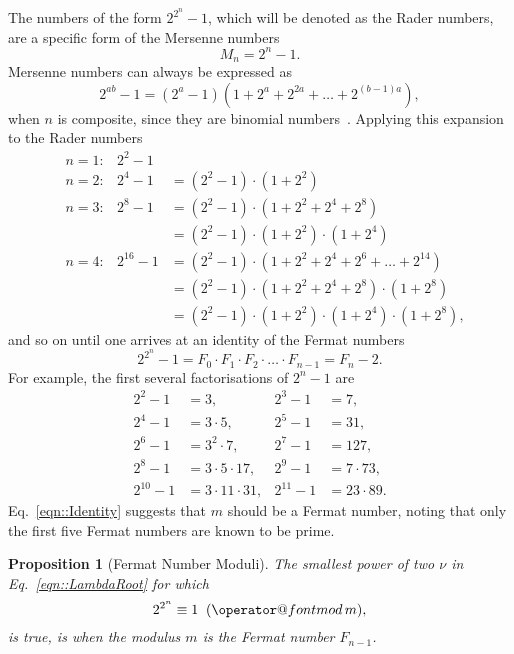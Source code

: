\documentclass[twocolumn]{IEEEtran}
\makeatletter
\def\imod#1{\allowbreak\mkern10mu({\operator@font mod}\,#1)}
\newtheorem{theorem}{Proposition}
\newcommand{\modulusSymbol}{m}
\newcommand{\eqnTag}{Eq.}
\makeatother
\begin{document}
The numbers of the form $2^{2^n} - 1$, which will be denoted as the Rader numbers, are a specific form of the Mersenne numbers
\begin{equation}
 M_n = 2^{n} - 1.
\end{equation}
Mersenne numbers can always be expressed as
\begin{equation}\label{eqn::Binomial}
2^{ab} - 1 = \left(2^{a} - 1\right)\left(1 + 2^a + 2^{2a} + \ldots + 2^{(b-1)a}\right),
\end{equation}
when $n$ is composite, since they are binomial numbers~\citep[pg. 42]{Schumer2004}. Applying this expansion to the Rader numbers 
\begin{align*}
&n = 1:  & 2^2-1 \\
&n = 2:  & 2^4-1 &= (2^2-1)\cdot (1 +2^2)\\
&n = 3:  & 2^8-1 &= (2^2-1)\cdot (1 +2^2 + 2^4 + 2^8)\\
&              &       &= (2^2-1)\cdot (1+2^2) \cdot (1+2^4)\\
&n = 4:  & 2^{16}-1 &= (2^2-1)\cdot (1 + 2^2 + 2^4 + 2^6 + \ldots + 2^{14})\\
&              &        &= (2^2-1)\cdot (1 +2^2 + 2^4 + 2^8) \cdot (1+2^8)\\
&              &        &= (2^2-1)\cdot (1+2^2) \cdot (1+2^4) \cdot (1+2^8),
\end{align*}
and so on until one arrives at an identity of the Fermat numbers~\citep[pg. 26]{Krizek2001}
\begin{equation}\label{eqn::Identity}
 2^{2^n} - 1 = F_0\cdot F_1 \cdot F_2 \cdot\ldots\cdot F_{n-1} = F_{n} - 2.
\end{equation}
For example, the first several factorisations of $2^{n} - 1$ are
\begin{align}
 2^{2} - 1 &= 3, & 2^{3} - 1 &= 7,\nonumber\\
 2^{4} - 1 &= 3\cdot 5, & 2^{5} - 1 &= 31,\nonumber\\
 2^{6} - 1 &= 3^2\cdot 7, & 2^{7} - 1 &= 127,\nonumber\\
 2^{8} - 1 &= 3\cdot 5\cdot 17, & 2^{9} - 1 &= 7\cdot 73,\nonumber\\
 2^{10} - 1 &= 3\cdot 11\cdot 31, & 2^{11} - 1 &= 23\cdot 89.\nonumber
\end{align}
\eqnTag~\eqref{eqn::Identity} suggests that $\modulusSymbol$ should be a Fermat number, noting that only the first five Fermat numbers are known to be prime.
\begin{theorem}[Fermat Number Moduli]\label{thm::FermatModuli}
The smallest power of two $\nu$ in \eqnTag~\eqref{eqn::LambdaRoot} for which
\begin{equation}\label{eqn::Rader}
 2^{2^n} \equiv 1 \imod \modulusSymbol,
\end{equation}
is true, is when the modulus $\modulusSymbol$ is the Fermat number $F_{n-1}$.
\end{theorem}
\end{document}
